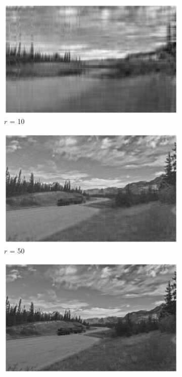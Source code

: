 \begin{figure}[h]
  \centering
  \begin{subfigure}{0.3\textwidth}
      \includegraphics[width=\textwidth]{external_content/media/compression_example/n=10.png}
      \caption{$r$ = 10}
      \label{fig:compressionNX}
  \end{subfigure}
  \hfill
  \begin{subfigure}{0.3\textwidth}
      \includegraphics[width=\textwidth]{external_content/media/compression_example/n=50.png}
      \caption{$r$ = 50}
      \label{fig:compressionNL}
  \end{subfigure}
  \hfill
  \begin{subfigure}{0.3\textwidth}
      \includegraphics[width=\textwidth]{external_content/media/compression_example/n=120.png}

\end{subfigure}
\end{figure}
